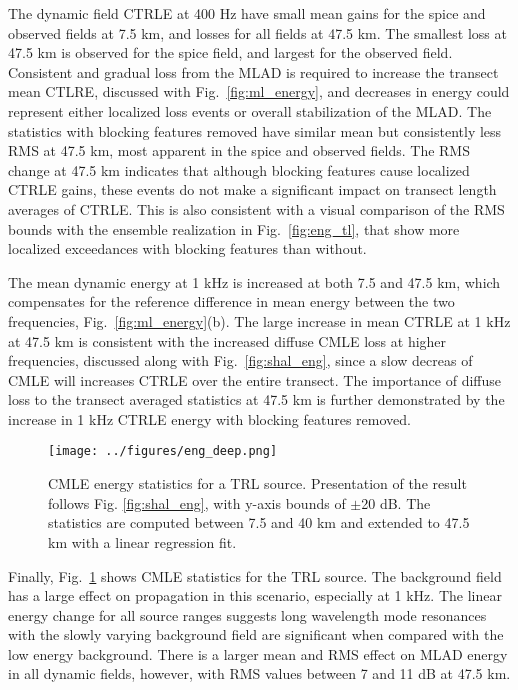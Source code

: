 \documentclass[preprint,NumberedRefs]{JASA}
\begin{document}
The dynamic field CTRLE at 400 Hz have small mean gains for the spice and observed fields at 7.5 km, and losses for all fields at 47.5 km. The smallest loss at 47.5 km is observed for the spice field, and largest for the observed field. Consistent and gradual loss from the MLAD is required to increase the transect mean CTLRE, discussed with Fig.~\ref{fig:ml_energy}, and decreases in energy could represent either localized loss events or overall stabilization of the MLAD. The statistics with blocking features removed have similar mean but consistently less RMS at 47.5 km, most apparent in the spice and observed fields. The RMS change at 47.5 km indicates that although blocking features cause localized CTRLE gains, these events do not make a significant impact on transect length averages of CTRLE. This is also consistent with a visual comparison of the RMS bounds with the ensemble realization in Fig.~\ref{fig:eng_tl}, that show more localized exceedances with blocking features than without.

The mean dynamic energy at 1 kHz is increased at both 7.5 and 47.5 km, which compensates for the reference difference in mean energy between the two frequencies, Fig.~\ref{fig:ml_energy}(b). The large increase in mean CTRLE at 1 kHz at 47.5 km is consistent with the increased diffuse CMLE loss at higher frequencies, discussed along with Fig.~\ref{fig:shal_eng}, since a slow decreas of CMLE will increases CTRLE over the entire transect. The importance of diffuse loss to the transect averaged statistics at 47.5 km is further demonstrated by the increase in 1 kHz CTRLE energy with blocking features removed.

\begin{figure}
\texttt{[image: ../figures/eng\_deep.png]}
    \caption{CMLE energy statistics for a TRL source. Presentation of the result follows Fig. \ref{fig:shal_eng}, with y-axis bounds of $\pm$20 dB. The statistics are computed between 7.5 and 40 km and extended to 47.5 km with a linear regression fit.}
    \label{fig:deep_eng}
\end{figure}
Finally, Fig.~\ref{fig:deep_eng} shows CMLE statistics for the TRL source. The background field has a large effect on propagation in this scenario, especially at 1 kHz. The linear energy change for all source ranges suggests long wavelength mode resonances with the slowly varying background field\cite{colosi21} are significant when compared with the low energy background. There is a larger mean and RMS effect on MLAD energy in all dynamic fields, however, with RMS values between 7 and 11 dB at 47.5 km.
\end{document}
